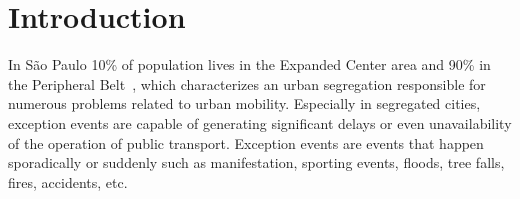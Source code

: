 \documentclass[runningheads]{llncs}
\begin{document}
%
%
%
%
%
%
% 
% 
%

\section{Introduction}

In São Paulo 10\% of population lives in the Expanded Center area and 90\% in the Peripheral Belt~\cite{SA201722}, which characterizes an urban segregation responsible for numerous problems related to urban mobility. Especially in segregated cities, exception events are capable of generating significant delays or even unavailability of the operation of public transport.
Exception events are events that happen sporadically or suddenly such as manifestation, sporting events, floods, tree falls, fires, accidents, etc.
\end{document}
